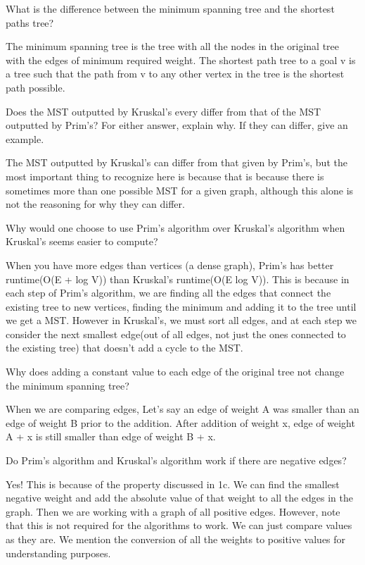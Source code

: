 \question  What is the difference between the minimum spanning tree and the shortest paths tree?

\begin{solution}[0.5in]
The minimum spanning tree is the tree with all the nodes in the original tree with the edges of minimum required weight. The shortest path tree to a goal v is a tree such that the path from v to any other vertex in the tree is the shortest path possible. 
\end{solution}

\question  Does the MST outputted by Kruskal's every differ from that of the MST outputted by Prim's? For either answer, explain why. If they can differ, give an example. 

\begin{solution}[0.5in]
The MST outputted by Kruskal's can differ from that given by Prim's, but the most important thing to recognize here is because that is because there is sometimes more than one possible MST for a given graph, although this alone is not the reasoning for why they can differ. 
\end{solution}

\question Why would one choose to use Prim’s algorithm over Kruskal’s algorithm when Kruskal’s seems easier to compute?
\begin{solution}[0.75in]
When you have more edges than vertices (a dense graph), Prim’s has better runtime(O(E + log V)) than Kruskal’s runtime(O(E log V)). This is because in each step of Prim’s algorithm, we are finding all the edges that connect the existing tree to new vertices, finding the minimum and adding it to the tree until we get a MST. However in Kruskal’s, we must sort all edges, and at each step we consider the next smallest edge(out of all edges, not just the ones connected to the existing tree) that doesn’t add a cycle to the MST. 

\end{solution}

\question Why does adding a constant value to each edge of the original tree not change the minimum spanning tree?
\begin{solution}[0.75in]
When we are comparing edges, Let’s say an edge of weight  A was smaller than an edge of weight B prior to the addition. After addition of weight x, edge of weight A + x is still smaller than edge of weight B + x. 
\end{solution}

\question Do Prim’s algorithm and Kruskal’s algorithm work if there are negative edges?
\begin{solution}[0.75in]
Yes! This is because of the property discussed in 1c. We can find the smallest negative weight and add the absolute value of that weight to all the edges in the graph. Then we are working with a graph of all positive edges. However, note that this is not required for the algorithms to work. We can just compare values as they are. We mention the conversion of all the weights to positive values for understanding purposes. 
\end{solution}